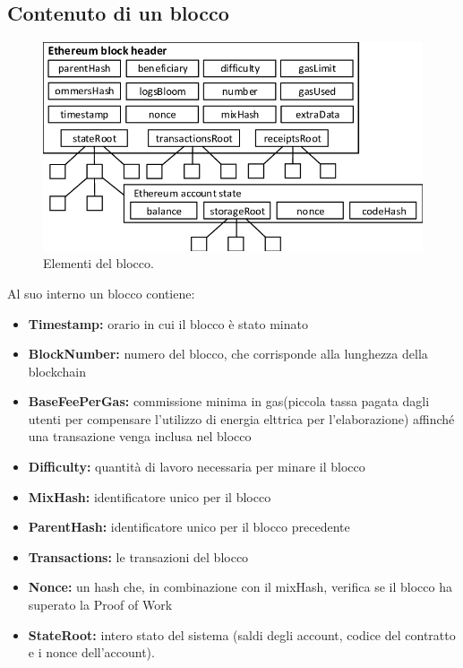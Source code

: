 \documentclass[a4paper,11pt]{report}
\begin{document}
\subsection{Contenuto di un blocco}
\begin{figure}[htbp] 
\begin{center}
\includegraphics[scale=0.45]{img/block.png}
\end{center}
\caption{Elementi del blocco. \cite{block}}
\end{figure} 

Al suo interno un blocco contiene:
\begin{itemize} %
\item \textbf{Timestamp:} orario in cui il blocco è stato minato
\item \textbf{BlockNumber:} numero del blocco, che corrisponde alla lunghezza della blockchain
\item \textbf{BaseFeePerGas:} commissione minima in gas(piccola tassa pagata dagli utenti per compensare l'utilizzo di energia elttrica per l'elaborazione) affinché una transazione venga inclusa nel blocco
\item \textbf{Difficulty:} quantità di lavoro necessaria per minare il blocco
\item \textbf{MixHash:} identificatore unico per il blocco
\item \textbf{ParentHash:} identificatore unico per il blocco precedente
\item \textbf{Transactions:} le transazioni del blocco
\item \textbf{Nonce:} un hash che, in combinazione con il mixHash, verifica se il blocco ha superato la Proof of Work
\item \textbf{StateRoot:} intero stato del sistema (saldi degli account, codice del contratto e i nonce dell'account).
\end{itemize}
\end{document}
